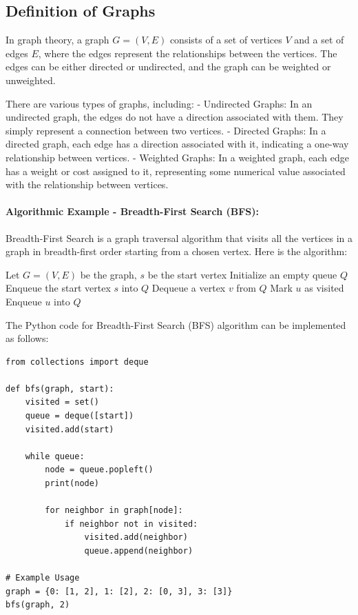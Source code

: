 \documentclass[12pt]{book} %
\begin{document}
\subsection{Definition of Graphs}
In graph theory, a graph $G = (V, E)$ consists of a set of vertices $V$ and a set of edges $E$, where the edges represent the relationships between the vertices. The edges can be either directed or undirected, and the graph can be weighted or unweighted.

There are various types of graphs, including:
- Undirected Graphs: In an undirected graph, the edges do not have a direction associated with them. They simply represent a connection between two vertices.
- Directed Graphs: In a directed graph, each edge has a direction associated with it, indicating a one-way relationship between vertices.
- Weighted Graphs: In a weighted graph, each edge has a weight or cost assigned to it, representing some numerical value associated with the relationship between vertices.

\paragraph{Algorithmic Example - Breadth-First Search (BFS):}
Breadth-First Search is a graph traversal algorithm that visits all the vertices in a graph in breadth-first order starting from a chosen vertex. Here is the algorithm:

\begin{algorithm}
\caption{Breadth-First Search (BFS)}
\begin{algorithmic}
\State Let $G = (V, E)$ be the graph, $s$ be the start vertex
\State Initialize an empty queue $Q$
\State Enqueue the start vertex $s$ into $Q$
    \State Dequeue a vertex $v$ from $Q$
            \State Mark $u$ as visited
            \State Enqueue $u$ into $Q$
        \EndIf
    \EndFor
\EndWhile
\end{algorithmic}
\end{algorithm}

The Python code for Breadth-First Search (BFS) algorithm can be implemented as follows:

\begin{lstlisting}
from collections import deque

def bfs(graph, start):
    visited = set()
    queue = deque([start])
    visited.add(start)

    while queue:
        node = queue.popleft()
        print(node)

        for neighbor in graph[node]:
            if neighbor not in visited:
                visited.add(neighbor)
                queue.append(neighbor)

# Example Usage
graph = {0: [1, 2], 1: [2], 2: [0, 3], 3: [3]}
bfs(graph, 2)
\end{lstlisting}
\end{document}
